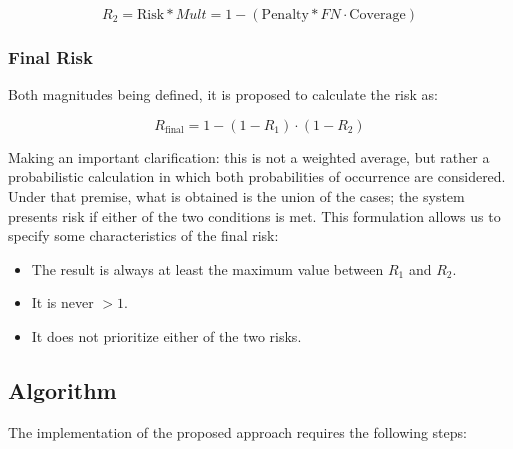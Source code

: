 \documentclass[11pt,a4paper]{article}
\begin{document}
\begin{equation*}
R_2=\text{Risk}*{Mult} = 1 - ( \text{Penalty}*{FN} \cdot \text{Coverage} )
\end{equation*}

\subsubsection{Final Risk}

Both magnitudes being defined, it is proposed to
calculate the risk as:

\begin{equation*}
R_{\text{final}} = 1 - (1 - R_1) \cdot (1 - R_2)
\end{equation*}

Making an important clarification: this is not a weighted average, but rather a probabilistic calculation in which both probabilities of occurrence are considered. Under that premise, what is obtained is the union of the cases; the system presents risk if either of the two conditions is met. This formulation allows us to specify some characteristics of the final risk:

\begin{itemize}
\item The result is always at least the maximum value between $R_1$ and $R_2$.
\item It is never $>1$.
\item It does not prioritize either of the two risks.
\end{itemize}

\subsection{Algorithm}

The implementation of the proposed approach requires the following steps:
\end{document}
